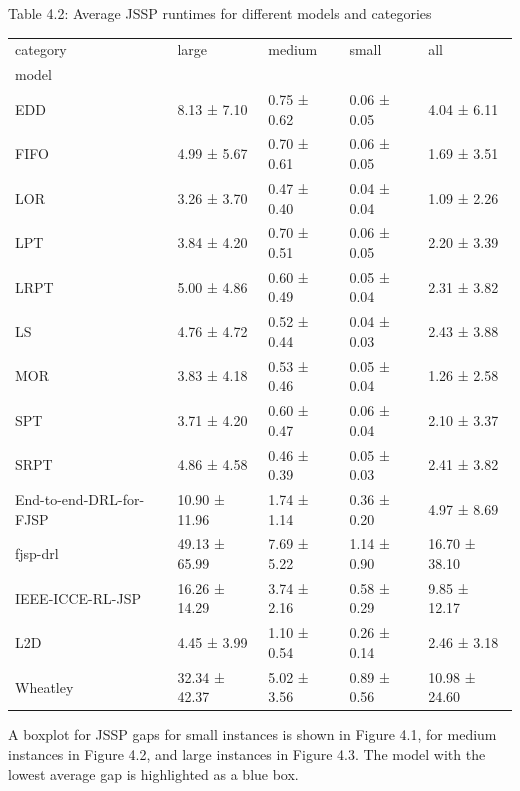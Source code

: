 \begin{table}[H]
    Table 4.2: Average JSSP runtimes for different models and categories\\
    \vspace{1mm}
    \small
    \begin{tabular}{lllll}
        \toprule
        category & large & medium & small & all \\
        model &  &  &  &  \\
        \midrule
        EDD & 8.13 ± 7.10 & 0.75 ± 0.62 & 0.06 ± 0.05 & 4.04 ± 6.11 \\
        FIFO & 4.99 ± 5.67 & 0.70 ± 0.61 & 0.06 ± 0.05 & 1.69 ± 3.51 \\
        LOR & 3.26 ± 3.70 & 0.47 ± 0.40 & 0.04 ± 0.04 & 1.09 ± 2.26 \\
        LPT & 3.84 ± 4.20 & 0.70 ± 0.51 & 0.06 ± 0.05 & 2.20 ± 3.39 \\
        LRPT & 5.00 ± 4.86 & 0.60 ± 0.49 & 0.05 ± 0.04 & 2.31 ± 3.82 \\
        LS & 4.76 ± 4.72 & 0.52 ± 0.44 & 0.04 ± 0.03 & 2.43 ± 3.88 \\
        MOR & 3.83 ± 4.18 & 0.53 ± 0.46 & 0.05 ± 0.04 & 1.26 ± 2.58 \\
        SPT & 3.71 ± 4.20 & 0.60 ± 0.47 & 0.06 ± 0.04 & 2.10 ± 3.37 \\
        SRPT & 4.86 ± 4.58 & 0.46 ± 0.39 & 0.05 ± 0.03 & 2.41 ± 3.82 \\
        End-to-end-DRL-for-FJSP & 10.90 ± 11.96 & 1.74 ± 1.14 & 0.36 ± 0.20 & 4.97 ± 8.69 \\
        fjsp-drl & 49.13 ± 65.99 & 7.69 ± 5.22 & 1.14 ± 0.90 & 16.70 ± 38.10 \\
        IEEE-ICCE-RL-JSP & 16.26 ± 14.29 & 3.74 ± 2.16 & 0.58 ± 0.29 & 9.85 ± 12.17 \\
        L2D & 4.45 ± 3.99 & 1.10 ± 0.54 & 0.26 ± 0.14 & 2.46 ± 3.18 \\
        Wheatley & 32.34 ± 42.37 & 5.02 ± 3.56 & 0.89 ± 0.56 & 10.98 ± 24.60 \\
        \bottomrule
        \end{tabular}        
\end{table}

A boxplot for JSSP gaps for small instances is shown in Figure 4.1, for medium instances in Figure 4.2, and large instances in Figure 4.3. The model with the lowest average gap is highlighted as a blue box.

